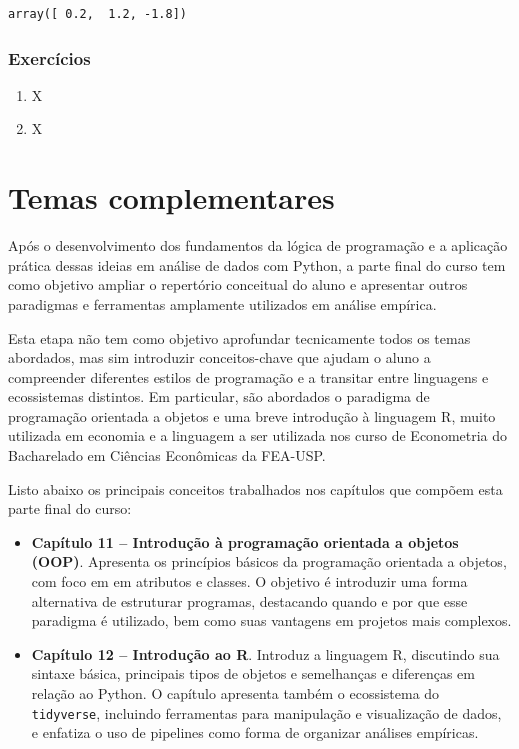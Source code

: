 \documentclass[
  brazilian,
  letterpaper,
  DIV=11,
  numbers=noendperiod]{scrreprt}
\begin{document}
\begin{verbatim}
array([ 0.2,  1.2, -1.8])
\end{verbatim}

\section{Exercícios}\label{exercuxedcios-6}

\begin{enumerate}
\def\labelenumi{\arabic{enumi}.}
\item
  X
\item
  X
\end{enumerate}

\part{Temas complementares}

Após o desenvolvimento dos fundamentos da lógica de programação e a
aplicação prática dessas ideias em análise de dados com Python, a parte
final do curso tem como objetivo ampliar o repertório conceitual do
aluno e apresentar outros paradigmas e ferramentas amplamente utilizados
em análise empírica.

Esta etapa não tem como objetivo aprofundar tecnicamente todos os temas
abordados, mas sim introduzir conceitos-chave que ajudam o aluno a
compreender diferentes estilos de programação e a transitar entre
linguagens e ecossistemas distintos. Em particular, são abordados o
paradigma de programação orientada a objetos e uma breve introdução à
linguagem R, muito utilizada em economia e a linguagem a ser utilizada
nos curso de Econometria do Bacharelado em Ciências Econômicas da
FEA-USP.

Listo abaixo os principais conceitos trabalhados nos capítulos que
compõem esta parte final do curso:

\begin{itemize}
\item
  \textbf{Capítulo 11 -- Introdução à programação orientada a objetos
  (OOP)}. Apresenta os princípios básicos da programação orientada a
  objetos, com foco em em atributos e classes. O objetivo é introduzir
  uma forma alternativa de estruturar programas, destacando quando e por
  que esse paradigma é utilizado, bem como suas vantagens em projetos
  mais complexos.
\item
  \textbf{Capítulo 12 -- Introdução ao R}. Introduz a linguagem R,
  discutindo sua sintaxe básica, principais tipos de objetos e
  semelhanças e diferenças em relação ao Python. O capítulo apresenta
  também o ecossistema do \texttt{tidyverse}, incluindo ferramentas para
  manipulação e visualização de dados, e enfatiza o uso de pipelines
  como forma de organizar análises empíricas.
\end{itemize}
\end{document}
